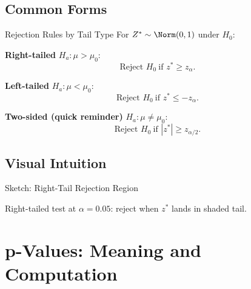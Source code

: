 \documentclass[aspectratio=169]{beamer}
\begin{document}
\subsection{Common Forms}
\begin{frame}{Rejection Rules by Tail Type}
  For \(Z^*\sim \Norm(0,1)\) under \(H_0\):

  \vspace{1mm}
  \textbf{Right-tailed} \(H_a:\mu>\mu_0\):
  \[
    \text{Reject }H_0\ \text{if } z^*\ge z_{\alpha}.
  \]

  \textbf{Left-tailed} \(H_a:\mu<\mu_0\):
  \[
    \text{Reject }H_0\ \text{if } z^*\le -z_{\alpha}.
  \]

  \textbf{Two-sided (quick reminder)} \(H_a:\mu\ne\mu_0\):
  \[
    \text{Reject }H_0\ \text{if } |z^*|\ge z_{\alpha/2}.
  \]
\end{frame}

\subsection{Visual Intuition}
\begin{frame}{Sketch: Right-Tail Rejection Region}
  \centering

  \vspace{1mm}
  Right-tailed test at \(\alpha=0.05\): reject when \(z^*\) lands in shaded tail.
\end{frame}

\section{p-Values: Meaning and Computation}
\end{document}
